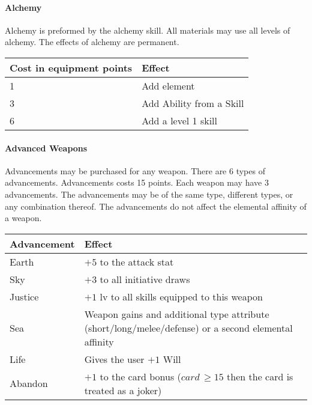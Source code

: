 \paragraph{Alchemy}
Alchemy is preformed by the alchemy skill. All materials may use all levels of
alchemy. The effects of alchemy are permanent.

\begin{center}
\begin{tabularx}{\textwidth}{X X}
\hline 
Cost in equipment points &Effect\\
\hline 1 & Add element\\
3 & Add Ability from a Skill\\
6 & Add a level 1 skill \\
\hline
\end{tabularx}
\end{center}

\paragraph{Advanced Weapons}

Advancements may be purchased for any weapon. There are 6 types of
advancements. Advancements costs 15 points. Each weapon may have 3
advancements. The advancements may be of the same type, different types, or any
combination thereof. The advancements do not affect the elemental affinity of a
weapon.

\begin{center}
\begin{tabularx}{\textwidth}{X X}
\hline
Advancement & Effect\\
\hline
Earth & $+5$ to the attack stat\\
Sky & $+3$ to all initiative draws \\
Justice & $+1$ lv to all skills equipped to this weapon\\
Sea & Weapon gains and additional type attribute (short/long/melee/defense) or a second elemental affinity \\
Life & Gives the user $+1$ Will\\
Abandon & $+ 1$ to the card bonus ($card\, \geq15$ then the card is treated as a joker) \\
\hline
\end{tabularx}
\end{center}

